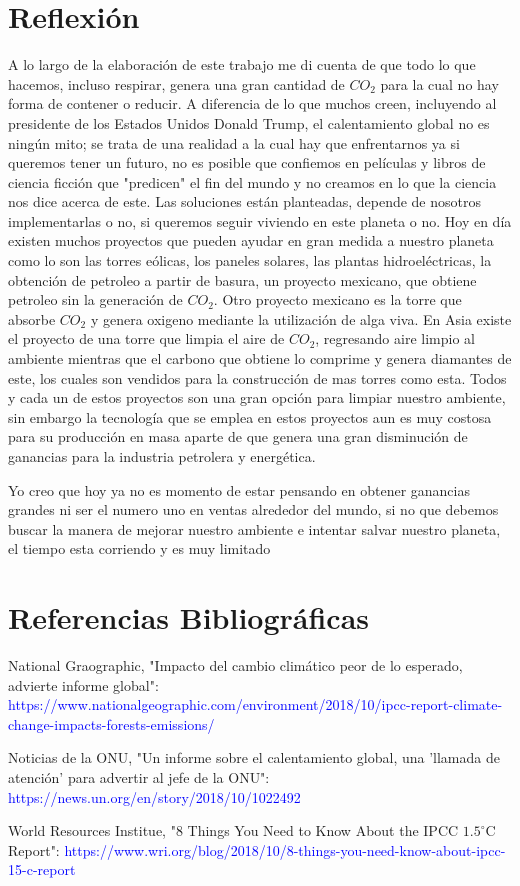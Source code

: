 \section{Reflexión}
A lo largo de la elaboración de este trabajo me di cuenta de que todo lo que hacemos, incluso respirar, genera una gran cantidad de $CO_2$ para la cual no hay forma de contener o reducir. A diferencia de lo que muchos creen, incluyendo al presidente de los Estados Unidos Donald Trump, el calentamiento global no es ningún mito; se trata de una realidad a la cual hay que enfrentarnos ya si queremos tener un futuro, no es posible que confiemos en películas y libros de ciencia ficción que "predicen" el fin del mundo y no creamos en lo que la ciencia nos dice acerca de este.
Las soluciones están planteadas, depende de nosotros implementarlas o no, si queremos seguir viviendo en este planeta o no. 
Hoy en día existen muchos proyectos que pueden ayudar en gran medida a nuestro planeta como lo son las torres eólicas, los paneles solares, las plantas hidroeléctricas, la obtención de petroleo a partir de basura, un proyecto mexicano, que obtiene petroleo sin la generación de $CO_2$. Otro proyecto mexicano es la torre que absorbe $CO_2$ y genera oxigeno mediante la utilización de alga viva. En Asia existe el proyecto de una torre que limpia el aire de $CO_2$, regresando aire limpio al ambiente mientras que el carbono que obtiene lo comprime y genera diamantes de este, los cuales son vendidos para la construcción de mas torres como esta. Todos y cada un de estos proyectos son una gran opción para limpiar nuestro ambiente, sin embargo la tecnología que se emplea en estos proyectos aun es muy costosa para su producción en masa aparte de que genera una gran disminución de ganancias para la industria petrolera y energética.

Yo creo que hoy ya no es momento de estar pensando en obtener ganancias grandes ni ser el numero uno en ventas alrededor del mundo, si no que debemos buscar la manera de mejorar nuestro ambiente e intentar salvar nuestro planeta, el tiempo esta corriendo y es muy limitado


\section{Referencias Bibliográficas}
National Graographic, "Impacto del cambio climático peor de lo esperado, advierte informe global":
\textcolor{blue}{https://www.nationalgeographic.com/environment/2018/10/ipcc-report-climate-change-impacts-forests-emissions/}

Noticias de la ONU, "Un informe sobre el calentamiento global, una 'llamada de atención' para advertir al jefe de la ONU":
\textcolor{blue}{https://news.un.org/en/story/2018/10/1022492}

World Resources Institue, "8 Things You Need to Know About the IPCC $1.5^\circ$C Report":
\textcolor{blue}{https://www.wri.org/blog/2018/10/8-things-you-need-know-about-ipcc-15-c-report}




 